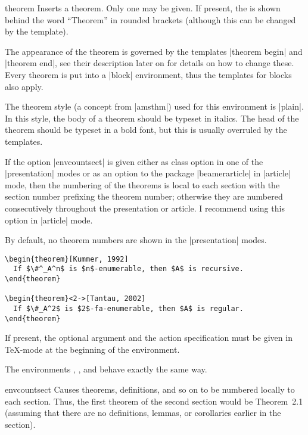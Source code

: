 \begin{environment}{{theorem}}
  Inserts a theorem. Only one  may be
  given. If present, the  is shown behind the
  word ``Theorem'' in rounded brackets (although this can be changed by
  the template).

  The appearance of the theorem is governed by the templates
  |theorem begin| and |theorem end|, see their description later on
  for details on how to change these. Every theorem is put into a
  |block| environment, thus the templates for blocks also apply.

  The theorem style (a concept from |amsthm|) used for this
  environment is |plain|. In this style, the body of a theorem should
  be typeset in italics. The head of the theorem should be typeset in
  a bold font, but this is usually overruled by the templates.

  If the option |envcountsect| is given either as class option in one
  of the |presentation| modes or as an option to the package
  |beamerarticle| in |article| mode, then the numbering of the
  theorems is local to each section with the section number prefixing
  the theorem number; otherwise they are numbered consecutively
  throughout the presentation or article. I recommend using this
  option in |article| mode.

  By default, no theorem numbers are shown in the |presentation| modes.

  \example
\begin{verbatim}
\begin{theorem}[Kummer, 1992]
  If $\#^_A^n$ is $n$-enumerable, then $A$ is recursive.
\end{theorem}

\begin{theorem}<2->[Tantau, 2002]
  If $\#_A^2$ is $2$-fa-enumerable, then $A$ is regular.
\end{theorem}
\end{verbatim}

  \lyxnote
  If present, the optional argument and the action specification must
  be given in \TeX-mode at the beginning of the environment.
\end{environment}

The environments , , and
 behave exactly the same way.

\begin{classoption}{envcountsect}
  Causes theorems, definitions, and so on to be numbered locally to
  each section. Thus, the first theorem of the second section would be
  Theorem~2.1 (assuming that there are no definitions, lemmas, or
  corollaries earlier in the section).
\end{classoption}

